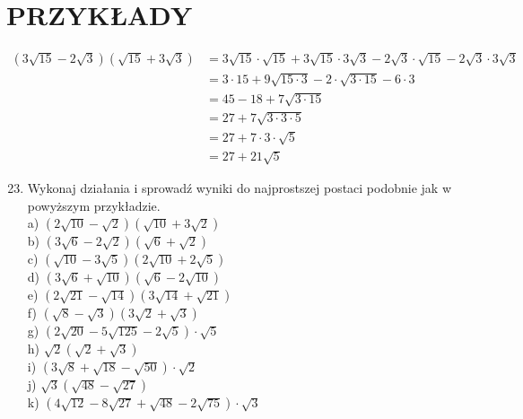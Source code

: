 \documentclass[10pt]{article}
\begin{document}
\section*{PRZYKŁADY}
\[
\begin{aligned}
(3 \sqrt{15}-2 \sqrt{3})(\sqrt{15}+3 \sqrt{3}) & =3 \sqrt{15} \cdot \sqrt{15}+3 \sqrt{15} \cdot 3 \sqrt{3}-2 \sqrt{3} \cdot \sqrt{15}-2 \sqrt{3} \cdot 3 \sqrt{3} \\
& =3 \cdot 15+9 \sqrt{15 \cdot 3}-2 \cdot \sqrt{3 \cdot 15}-6 \cdot 3 \\
& =45-18+7 \sqrt{3 \cdot 15} \\
& =27+7 \sqrt{3 \cdot 3 \cdot 5} \\
& =27+7 \cdot 3 \cdot \sqrt{5} \\
& =27+21 \sqrt{5}
\end{aligned}
\]

\begin{enumerate}
  \setcounter{enumi}{22}
  \item Wykonaj działania i sprowadź wyniki do najprostszej postaci podobnie jak w powyższym przykładzie.\\
a) \((2 \sqrt{10}-\sqrt{2})(\sqrt{10}+3 \sqrt{2})\)\\
b) \((3 \sqrt{6}-2 \sqrt{2})(\sqrt{6}+\sqrt{2})\)\\
c) \((\sqrt{10}-3 \sqrt{5})(2 \sqrt{10}+2 \sqrt{5})\)\\
d) \((3 \sqrt{6}+\sqrt{10})(\sqrt{6}-2 \sqrt{10})\)\\
e) \((2 \sqrt{21}-\sqrt{14})(3 \sqrt{14}+\sqrt{21})\)\\
f) \((\sqrt{8}-\sqrt{3})(3 \sqrt{2}+\sqrt{3})\)\\
g) \((2 \sqrt{20}-5 \sqrt{125}-2 \sqrt{5}) \cdot \sqrt{5}\)\\
h) \(\sqrt{2}(\sqrt{2}+\sqrt{3})\)\\
i) \((3 \sqrt{8}+\sqrt{18}-\sqrt{50}) \cdot \sqrt{2}\)\\
j) \(\sqrt{3}(\sqrt{48}-\sqrt{27})\)\\
k) \((4 \sqrt{12}-8 \sqrt{27}+\sqrt{48}-2 \sqrt{75}) \cdot \sqrt{3}\)
\end{enumerate}
\end{document}
